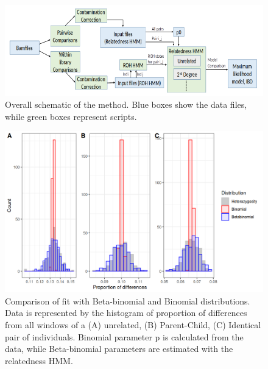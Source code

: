 \documentclass[12pt, letterpaper]{article}
\begin{document}
\renewcommand{\figurename}{Fig. S}
\begin{figure}[h!]
    \includegraphics[width=18cm]{plots/inkscape_finalImg/schematic_sup.png}
    \centering
    \caption{Overall schematic of the method. Blue boxes show the data files, while green boxes represent scripts.}
    \label{figS0:schematic}
\end{figure}




\begin{figure}[h!]
    \includegraphics[width=18cm]{supplementary_info/plots/binom.png}
    \centering
    \caption{Comparison of fit with Beta-binomial and Binomial distributions. Data is represented by the histogram of proportion of differences from all windows of a (A) unrelated, (B) Parent-Child, (C) Identical pair of individuals. Binomial parameter p is calculated from the data, while Beta-binomial parameters are estimated with the relatedness HMM.}
    \label{figS1:binom}
    
\end{figure}
\end{document}

